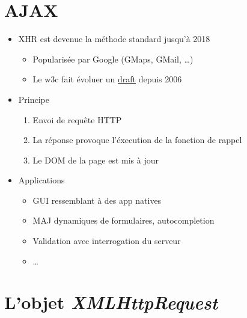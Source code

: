 \hypertarget{ajax}{%
\section{AJAX}\label{ajax}}

\begin{itemize}
\tightlist
\item
  XHR est devenue la méthode standard jusqu'à 2018

  \begin{itemize}
  \tightlist
  \item
    Popularisée par Google (GMaps, GMail, \ldots)
  \item
    Le w3c fait évoluer un
    \href{https://www.w3.org/TR/XMLHttpRequest/}{draft} depuis 2006
  \end{itemize}
\item
  Principe

  \begin{enumerate}
  \def\labelenumi{\arabic{enumi}.}
  \tightlist
  \item
    Envoi de requête HTTP
  \item
    La réponse provoque l'éxecution de la fonction de rappel
  \item
    Le DOM de la page est mis à jour
  \end{enumerate}
\item
  Applications

  \begin{itemize}
  \tightlist
  \item
    GUI ressemblant à des app natives
  \item
    MAJ dynamiques de formulaires, autocompletion
  \item
    Validation avec interrogation du serveur
  \item
    \ldots{}
  \end{itemize}
\end{itemize}

\hypertarget{lobjet-xmlhttprequest}{%
\section{\texorpdfstring{L'objet
\emph{XMLHttpRequest}}{L'objet XMLHttpRequest}}\label{lobjet-xmlhttprequest}}

